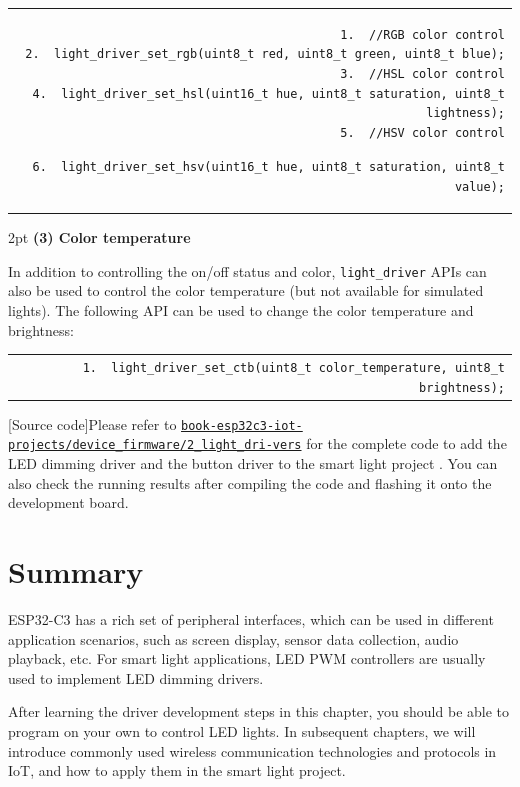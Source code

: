 \documentclass[a4paper,12pt,openany]{book}
\renewcommand{\ttfamily}{\fontfamily{pcr}\selectfont}
\renewcommand{\arraystretch}{1}
\newenvironment{codebloc}{ %
    \ttfamily\footnotesize
    \renewcommand{\arraystretch}{1}
}
\newcommand{\note}[2][NOTE]{ %
\vspace{6pt}
\begin{tabular}{b{\textwidth}}
\hline
\fontfamily{phv}\selectfont \textbf{#1}\\
\leftskip 1em #2\\
\hline
\end{tabular}
}
\begin{document}
\begin{codebloc}
\begin{tabular}{d}
\vspace{2pt}
\begin{verbatim}
1.  //RGB color control
2.  light_driver_set_rgb(uint8_t red, uint8_t green, uint8_t blue);
3.  //HSL color control
4.  light_driver_set_hsl(uint16_t hue, uint8_t saturation, uint8_t lightness);
5.  //HSV color control
\end{verbatim}
\verb|6.  light_driver_set_hsv(uint16_t hue, uint8_t saturation, uint8_t value);|
\end{tabular}
\end{codebloc}

\vspace{2pt}
\textbf{(3)	Color temperature}

In addition to controlling the on/off status and color, \verb|light_driver| APIs can also be used to control the color temperature (but not available for simulated lights). The following API can be used to change the color temperature and brightness:

\begin{codebloc}
\begin{tabular}{d}
\verb|1.  light_driver_set_ctb(uint8_t color_temperature, uint8_t brightness);|
\end{tabular}
\end{codebloc}

\note[Source code]{Please refer to \href{https://github.com/espressif/book-esp32c3-iot-projects/tree/main/device_firmware/2_light_drivers}{\texttt{book-esp32c3-iot-projects/device\_firmware/2\_light\_dri-\newline vers}} for the complete code to add the LED dimming driver and the button driver to the smart light project . You can also check the running results after compiling the code and flashing it onto the development board.}

\section{Summary}
ESP32-C3 has a rich set of peripheral interfaces, which can be used in different application scenarios, such as screen display, sensor data collection, audio playback, etc. For smart light applications, LED PWM controllers are usually used to implement LED dimming drivers.

After learning the driver development steps in this chapter, you should be able to program on your own to control LED lights. In subsequent chapters, we will introduce commonly used wireless communication technologies and protocols in IoT, and how to apply them in the smart light project.
\end{document}
